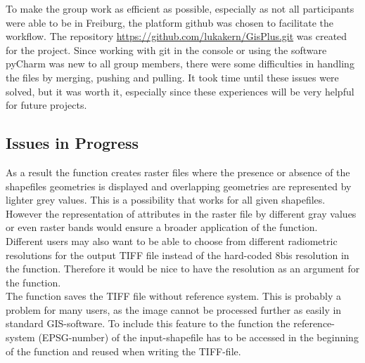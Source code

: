 \documentclass[10pt, a4paper]{article}
\begin{document}
	To make the group work as efficient as possible, especially as not all participants were able to be in Freiburg, the platform github was chosen to facilitate the workflow. The repository \url{https://github.com/lukakern/GisPlus.git} was created for the project. Since working with git in the console or using the software pyCharm was new to all group members, there were some difficulties in handling the files by merging, pushing and pulling. It took time until these issues were solved, but it was worth it, especially since these experiences will be very helpful for future projects.
	
	\subsection*{Issues in Progress}
	As a result the function creates raster files where the presence or absence of the shapefiles geometries is displayed and overlapping geometries are represented by lighter grey values. This is a possibility that works for all given shapefiles. However the representation of attributes in the raster file by different gray values or even raster bands would ensure a broader application of the function.\\
	
	Different users may also want to be able to choose from different radiometric resolutions for the output TIFF file instead of the hard-coded 8bis resolution in the function. Therefore it would be nice to have the resolution as an argument for the function.\\
	
	The function saves the TIFF file without reference system. This is probably a problem for many users, as the image cannot be processed further as easily in standard GIS-software. To include this feature to the function the reference-system (EPSG-number) of the input-shapefile has to be accessed in the beginning of the function and reused when writing the TIFF-file.
	
	\begin{figure}[!htbp]
		\centering
	\end{figure}
	
	
	
	
\end{document}
